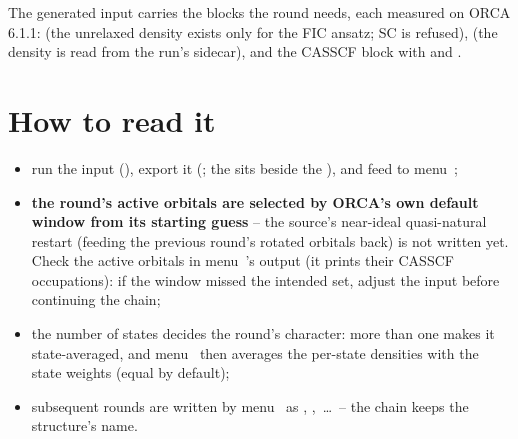 The generated input carries the blocks the round needs, each measured on ORCA
6.1.1:  (the unrelaxed density exists only for the FIC
ansatz; SC is refused),  (the density is read from the run's
 sidecar), and the CASSCF  block with
 and .

\section{How to read it}

\begin{readbox}
\begin{itemize}
  \item run the input (), export it
    (; the  sits beside the
    ), and feed  to menu~;
  \item \textbf{the round's active orbitals are selected by ORCA's own default
    window from its starting guess} -- the source's near-ideal quasi-natural
    restart (feeding the previous round's rotated orbitals back) is not
    written yet.  Check the active orbitals in menu~'s output (it
    prints their CASSCF occupations): if the window missed the intended set,
    adjust the input before continuing the chain;
  \item the number of states decides the round's character: more than one
    makes it state-averaged, and menu~ then averages the per-state
    densities with the state weights (equal by default);
  \item subsequent rounds are written by menu~ as
    , ,~\dots\ -- the chain keeps the
    structure's name.
\end{itemize}
\end{readbox}

